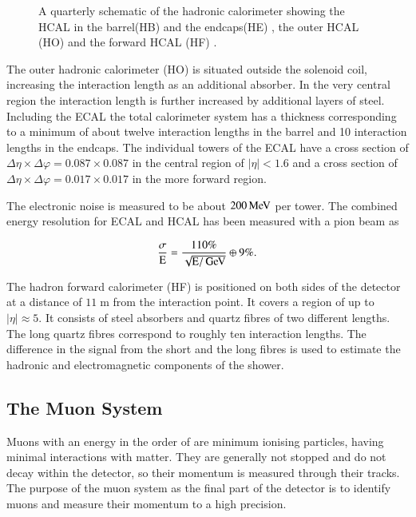\begin{figure}[htbp!]
  \begin{center}

\caption{A quarterly schematic of the hadronic calorimeter showing the HCAL in the barrel(HB) and the endcaps(HE) , the outer HCAL (HO) and the forward HCAL (HF)  \cite{2010JInst...5T3014C}.
  \label{fig:det_HCAL}}
  \end{center}
\end{figure}



The outer hadronic calorimeter (HO) is situated outside the solenoid coil, increasing the interaction length as an additional absorber.
In the very central region the interaction length is further increased by additional layers of steel.
Including the ECAL the total calorimeter system has a thickness corresponding to a minimum of about twelve interaction lengths in the barrel and 10 interaction lengths in the endcaps.
The individual towers of the ECAL have a cross section of $\Delta \eta \times \Delta \varphi = 0.087 \times 0.087$ in the central region of $|\eta|< 1.6$ and a cross section of $\Delta \eta \times \Delta \varphi = 0.017 \times 0.017$
in the more forward region.

The electronic noise is measured to be about $200 \,\text{Me\hspace{-.08em}V}$ per tower\cite{Sirunyan:2017ulk}.
The combined energy resolution for ECAL and HCAL has been measured with a pion beam as 

\begin{equation}
\frac{\sigma}{\mathrm{E}} = \frac{110\%}{\sqrt{\mathrm{E}/\,\text{Ge\hspace{-.08em}V}}} \oplus 9\%.
\end{equation}

The hadron forward calorimeter (HF) is positioned on both sides of the detector at a distance of $11 \; \si{\meter}$ from the interaction point.
It covers a region of up to $|\eta| \approx 5$. It consists of steel absorbers and quartz fibres of two different lengths. The long quartz fibres correspond to roughly ten interaction lengths. The difference in the signal from the short and the long fibres is used to estimate the hadronic and electromagnetic components of the shower.

\subsection{The Muon System}

Muons with an energy in the order of \GeV are minimum ionising particles, having minimal interactions with matter.
They are generally not stopped and do not decay within the detector, so their momentum is measured through their tracks.
The purpose of the muon system as the final part of the detector is to identify muons and measure their momentum to a high precision.

